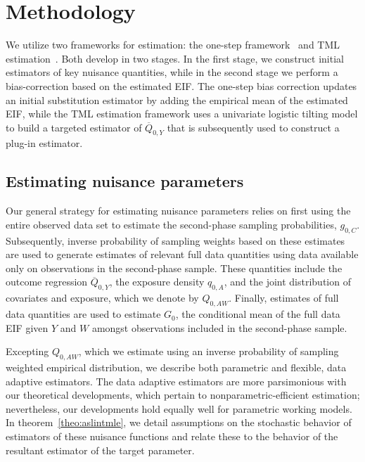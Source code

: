 \section{Methodology}\label{methods}

We utilize two frameworks for estimation: the one-step
framework~\citep{pfanzagl1985contributions} and TML
estimation~\citep{vdl2006targeted}. Both develop in two stages. In the first
stage, we construct initial estimators of key nuisance quantities, while in the
second stage we perform a bias-correction based on the estimated EIF. The
one-step bias correction updates an initial substitution estimator by adding the
empirical mean of the estimated EIF, while the TML estimation framework uses
a univariate logistic tilting model to build a targeted estimator of
$\overline{Q}_{0,Y}$ that is subsequently used to construct a plug-in estimator.

\subsection{Estimating nuisance parameters}\label{est_nuisance_param}

Our general strategy for estimating nuisance parameters relies on first using
the entire observed data set to estimate the second-phase sampling
probabilities, $g_{0,C}$. Subsequently, inverse probability of sampling weights
based on these estimates are used to generate estimates of relevant full data
quantities using data available only on observations in the second-phase sample.
These quantities include the outcome regression $\overline{Q}_{0,Y}$, the
exposure density $q_{0,A}$, and the joint distribution of covariates and
exposure, which we denote by $Q_{0,AW}$. Finally, estimates of full data
quantities are used to estimate $G_0$, the conditional mean of the full data EIF
given $Y$ and $W$ amongst observations included in the second-phase sample.

Excepting $Q_{0,AW}$, which we estimate using an inverse probability of sampling
weighted empirical distribution, we describe both parametric and flexible, data
adaptive estimators. The data adaptive estimators are more parsimonious with our
theoretical developments, which pertain to nonparametric-efficient estimation;
nevertheless, our developments hold equally well for parametric working models.
In theorem~\ref{theo:aslintmle}, we detail assumptions on the stochastic
behavior of estimators of these nuisance functions and relate these to the
behavior of the resultant estimator of the target parameter.

